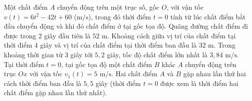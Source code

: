 \begin{ex}
Một chất điểm $A$ chuyển động trên một trục số, gốc $O$, với vận tốc $v(t)=6t^2-42t+60$ ($\mathrm{m/s}$), trong đó thời điểm $t=0$ tính từ lúc chất điểm bắt đầu chuyển động và khi đó chất điểm ở tại gốc tọa độ.
\choiceTF
{\True Quãng đường chất điểm đi được trong $2$ giây đầu tiên là $52$ m.}
{\True Khoảng cách giữa vị trí của chất điểm tại thời điểm $4$ giây và vị trí của chất điểm tại thời điểm ban đầu là $32$ m.}
{Trong khoảng thời gian từ $3$ giây tới $5{,}2$ giây, tốc độ chất điểm lớn nhất là $3{,}84$ $\mathrm{m/s}$.}
{Tại thời điểm $t=0$, tại gốc tọa độ một chất điểm $B$ khác $A$ chuyển động trên trục $Ox$ với vận tốc $v_1(t)=5$ $\mathrm{m/s}$. Hai chất điểm $A$ và $B$ gặp nhau lần thứ hai cách thời điểm ban đầu là $5{,}5$ giây (thời điểm $t=0$ được xem là thời điểm hai chất điểm gặp nhau lần thứ nhất).}
\end{ex}
